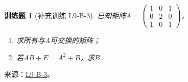 \documentclass[UTF8,12pt,a4paper,fontset=fandol]{ctexart}
\newtheorem{exercise}{训练题}[section]
\begin{document}
\begin{exercise}[补充训练 L9-B-3]\label{prob:L9-B-3}
已知矩阵$A=\begin{pmatrix}
                1 & 0 & 1 \\ 0 & 2 & 0 \\ 1 & 0 & 1
            \end{pmatrix}$，
        \begin{enumerate}
            \item 求所有与$A$可交换的矩阵；

            \item 若$AB+E=A^2+B$，求$B$.
        \end{enumerate}
\end{exercise}
\noindent 来源：\href{https://github.com/yhwu-is/Linear-Algebra-Left-Undone/blob/new/%E8%AE%B2%E4%B9%89/%E4%B8%93%E9%A2%98/9%20%E7%9F%A9%E9%98%B5%E8%BF%90%E7%AE%97%E8%BF%9B%E9%98%B6.tex}{L9-B-3}。
\end{document}
